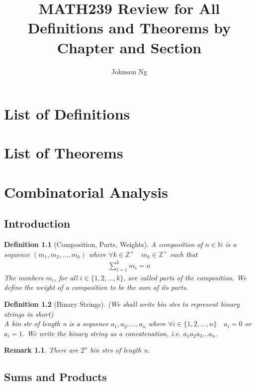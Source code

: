 \documentclass[11pt, oneside]{book}
\title{MATH239 Review for All Definitions and Theorems by Chapter and Section}
\author{Johnson Ng}
\theoremstyle{break}
\newtheorem{defn}{Definition}[section]
\newtheorem*{remark}{Remark}
\newcommand{\bb}[1]{\mathbb{#1}}		%
\begin{document}
\maketitle
\tableofcontents

\chapter*{List of Definitions}

\chapter*{List of Theorems}

\chapter{Combinatorial Analysis}


\section{Introduction}
\begin{defn}[Composition, Parts, Weights]
	A composition of $n \in \bb{N}$ is a sequence $(m_1, m_2, ..., m_k)$ where $\forall k \in \bb{Z}^+ \quad m_k \in \bb{Z}^+$ such that
	\begin{gather*}
		\sum_{i=1}^{k}m_i = n
	\end{gather*}
	The numbers $m_i$, for all $i\in\{1, 2, ..., k\}$, are called parts of the composition. We define the weight of a composition to be the sum of its parts.
		
\end{defn}

\begin{defn}[Binary Strings]
	(We shall write bin strs to represent binary strings in short) \\
	A bin str of length n is a sequence $a_1, a_2, ..., a_n$ where $\forall i \in \{1, 2, ..., n\} \quad a_i = 0$ or $a_i = 1$. We write the binary string as a concatenation, i.e. $a_1a_2a_3\hdots a_n$.
\end{defn}

\begin{remark}
	There are $2^n$ bin strs of length n.
\end{remark}


\section{Sums and Products}
\end{document}
